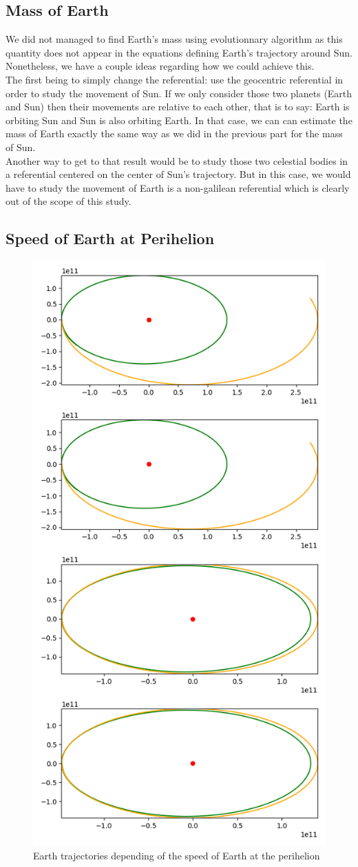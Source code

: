 \subsection{Mass of Earth}
We did not managed to find Earth's mass using evolutionnary algorithm as this quantity does not appear in the equations defining Earth's trajectory around Sun. Nonetheless, we have a couple ideas regarding how we could achieve this.\\
The first being to simply change the referential: use the geocentric referential in order to study the movement of Sun. If we only consider those two planets (Earth and Sun) then their movements are relative to each other, that is to say: Earth is orbiting Sun and Sun is also orbiting Earth. In that case, we can can estimate the mass of Earth exactly the same way as we did in the previous part for the mass of Sun.\\
Another way to get to that result would be to study those two celestial bodies in a referential centered on the center of Sun's trajectory. But in this case, we would have to study the movement of Earth is a non-galilean referential which is clearly out of the scope of this study.

\subsection{Speed of Earth at Perihelion}
\begin{figure}
    \center
    \includegraphics[width=0.5\linewidth,scale=.3]{img/earth_speed.png}
    \caption{Earth trajectories depending of the speed of Earth at the perihelion}
\end{figure}

